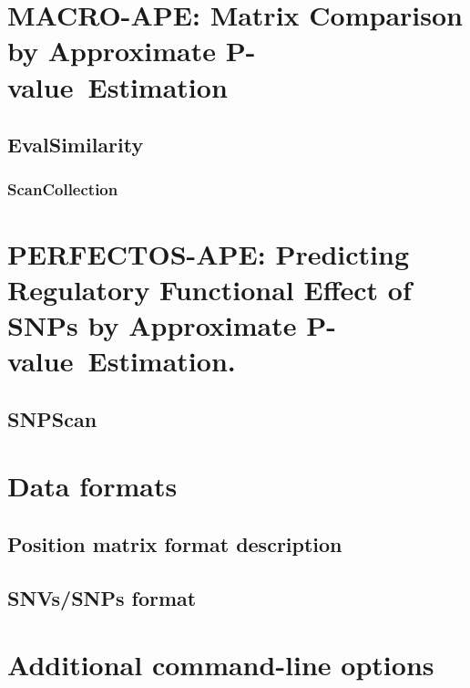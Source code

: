 \documentclass[]{article}
\newcommand*{\pvalue}{\mbox{P-value}}
\begin{document}
\section{MACRO-APE: Matrix Comparison by Approximate \pvalue\ Estimation}\label{macroape-introduction}


  \subsection{EvalSimilarity}\label{eval-similarity}
  

  \subsubsection{ScanCollection}\label{scan-collection}
  


\section{PERFECTOS-APE: Predicting Regulatory Functional Effect of SNPs by Approximate \pvalue\ Estimation.}\label{perfectosape-introduction}


  \subsection{SNPScan}\label{snp-scan}
  


\section{Data formats}\label{data-formats}
  \subsection{Position matrix format description}\label{position-matrix-format}
  

  \subsection{SNVs/SNPs format}\label{snp-format}
  


\section{Additional command-line options}\label{command-line-options}

\end{document}
